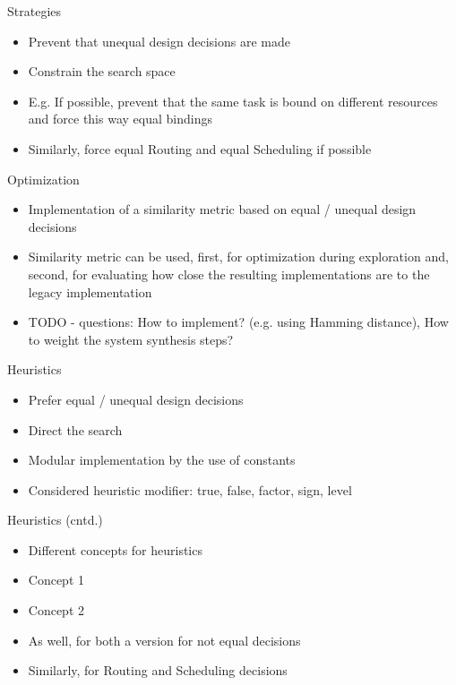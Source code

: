 \documentclass[11pt]{beamer}
\begin{document}
\begin{frame}{Strategies}
	\begin{itemize}
		\item Prevent that unequal design decisions are made
		\item Constrain the search space
		\item E.g. If possible, prevent that the same task is bound on different resources and force this way equal bindings 
		{\small}
		\pause
		\item Similarly, force equal Routing and equal Scheduling if possible
	\end{itemize}
\end{frame}

\begin{frame}{Optimization}
	\begin{itemize}
		\item Implementation of a similarity metric based on equal / unequal design decisions
		\item Similarity metric can be used, first, for optimization during exploration and, second, for evaluating how close the resulting implementations are to the legacy implementation
		\newline
		\pause 
		\item TODO - questions: How to implement? (e.g. using Hamming distance), How to weight the system synthesis steps?
	\end{itemize}
\end{frame}

\begin{frame}{Heuristics}
	\begin{itemize}
		\item Prefer equal / unequal design decisions
		\item Direct the search
		\pause
		\item Modular implementation by the use of constants
		{\small}
		\pause
		{\small}
		\pause
		\item Considered heuristic modifier: true, false, factor, sign, level
	\end{itemize}
\end{frame}

\begin{frame}{Heuristics (cntd.)}
	\begin{itemize}
		\item Different concepts for heuristics
		\item Concept 1
		{\small}
		\pause
		\item Concept 2
		{\small}
		\pause
		\item As well, for both a version for not equal decisions
		\item Similarly, for Routing and Scheduling decisions
	\end{itemize}
\end{frame}
\end{document}
